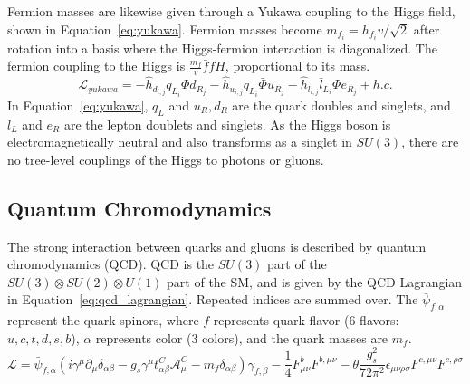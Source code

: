 Fermion masses are likewise given through a Yukawa coupling to the Higgs field, shown in Equation~\ref{eq:yukawa}. Fermion masses become $m_{f_i} = h_{f_i} v / \sqrt{2}$ after rotation into a basis where the Higgs-fermion interaction is diagonalized. The fermion coupling to the Higgs is $\frac{m_f}{v}\bar{f}fH$, proportional to its mass.
\begin{equation}
\mathcal{L}_{yukawa} = -\hat{h}_{d_{i,j}}\bar{q}_{L_i}\Phi d_{R_j} - \hat{h}_{u_{i,j}}\bar{q}_{L_i}\bar{\Phi} u_{R_j} -\hat{h}_{l_{i,j}}\bar{l}_{L_i}\Phi e_{R_j} + h.c.
    \label{eq:yukawa}
\end{equation}
In Equation~\ref{eq:yukawa}, $q_L$ and $u_R,d_R$ are the quark doubles and singlets, and $l_L$ and $e_R$ are the lepton doublets and singlets. As the Higgs boson is electromagnetically neutral and also transforms as a singlet in $SU(3)$, there are no tree-level couplings of the Higgs to photons or gluons.


\subsection{Quantum Chromodynamics}\label{ch:sm:qcd}
The strong interaction between quarks and gluons is described by quantum chromodynamics (QCD). QCD is the $SU(3)$ part of the $SU(3)\otimes SU(2)\otimes U(1)$ part of the SM, and is given by the QCD Lagrangian in Equation~\ref{eq:qcd_lagrangian}. Repeated indices are summed over. The $\bar{\psi}_{f,\alpha}$ represent the quark spinors, where $f$ represents quark flavor (6 flavors: $u,c,t,d,s,b$), $\alpha$ represents color (3 colors), and the quark masses are $m_f$. 
\begin{equation}
    \mathcal{L}=\bar{\psi}_{f,\alpha}(i\gamma^\mu \partial_\mu \delta_{\alpha\beta}-g_s\gamma^\mu t^C_{\alpha\beta}\mathcal{A}^C_\mu-m_f\delta_{\alpha\beta})\gamma_{f,\beta}-\frac{1}{4}F^b_{\mu\nu}F^{b,\mu\nu}-\theta\frac{g^2_{s}}{72\pi^2}\epsilon_{\mu\nu\rho\sigma}F^{c,\mu\nu}F^{c,\rho\sigma}
    \label{eq:qcd_lagrangian}
\end{equation}


